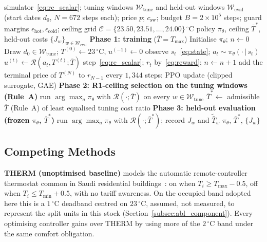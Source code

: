 \documentclass[3p,twocolumn,number]{elsarticle}
\newcommand{\Tmin}{T_{\min}}
\newcommand{\Tmax}{T_{\max}}
\newcommand{\csw}{c_{\mathrm{sw}}}
\begin{document}
\begin{algorithm}[!t]
\caption{RBRL: training, ceiling selection and evaluation}
\label{alg:rbrl}
\begin{algorithmic}[1]
\Require simulator~\eqref{eq:rc_scalar}; tuning windows $\mathcal{W}_{\mathrm{tune}}$
  and held-out windows $\mathcal{W}_{\mathrm{eval}}$ (start dates $d_0$, $N=672$
  steps each); price $p$; $\csw$; budget $B=2\times10^{5}$ steps; guard
  margins $\epsilon_{\mathrm{hot}},\epsilon_{\mathrm{cold}}$; ceiling grid
  $\mathcal{C}=\{23.50,23.51,\dots,24.00\}\,^\circ$C
\Ensure policy $\pi_\theta$, ceiling $\overline{T}^{*}$, held-out costs
  $\{J_w\}_{w\in\mathcal{W}_{\mathrm{eval}}}$
\Statex \textbf{Phase 1: training} ($\overline{T}=\Tmax$)
\State Initialise $\pi_\theta$; $n\leftarrow0$
 
  \State Draw $d_0\in\mathcal{W}_{\mathrm{tune}}$; $T^{(0)}\leftarrow23\,^\circ$C, $u^{(-1)}\leftarrow0$
    \State observe $s_t$~\eqref{eq:state}; $a_t\sim\pi_\theta(\cdot\,|\,s_t)$
    \State $u^{(t)}\leftarrow\mathcal{R}(a_t,T^{(t)};\overline{T})$ 
    \State step~\eqref{eq:rc_scalar}; $r_t$ by~\eqref{eq:reward}; $n\leftarrow n+1$
  \EndFor
  \State add the terminal price of $T^{(N)}$ to $r_{N-1}$
  \State every $1{,}344$ steps: PPO update (clipped surrogate, GAE)
\EndWhile
\Statex \textbf{Phase 2: R1-ceiling selection on the tuning windows (Rule~A)}
  \State run $\arg\max_a\pi_\theta$ with $\mathcal{R}(\cdot;\overline{T})$ on every $w\in\mathcal{W}_{\mathrm{tune}}$
\EndFor
\State $\overline{T}^{*}\leftarrow$ admissible $\overline{T}$ (Rule~A) of least
  equalised tuning cost ratio
\Statex \textbf{Phase 3: held-out evaluation (frozen $\pi_\theta$, $\overline{T}^{*}$)}
  \State run $\arg\max_a\pi_\theta$ with $\mathcal{R}(\cdot;\overline{T}^{*})$; record $J_w$ and $\tilde{\bar T}_w$
\EndFor
\State\Return $\pi_\theta$, $\overline{T}^{*}$, $\{J_w\}$ 
\end{algorithmic}
\end{algorithm}
 
\subsection{Competing Methods}
\label{subsec:compete}
 
\textbf{THERM (unoptimised baseline)} models the automatic remote-controller thermostat common in Saudi residential buildings~\cite{Alotaibi2024}: on when $T_i\ge\Tmax-0.5$, off when $T_i\le\Tmin+0.5$, with no tariff awareness. On the occupied band adopted here this is a $1\,^\circ$C deadband centred on $23\,^\circ$C, assumed, not measured, to represent the split units in this stock (Section~\ref{subsec:abl_component}). Every optimising controller gains over THERM by using more of the $2\,^\circ$C band under the same comfort obligation.
\end{document}
